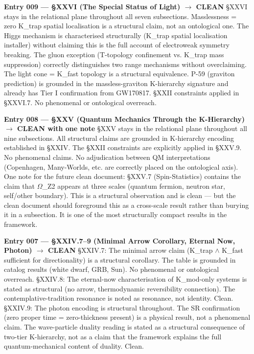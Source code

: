 \documentclass[12pt,a4paper]{article}
\begin{document}
\textbf{Entry 009 --- §XXVI (The Special Status of Light) $\rightarrow$ CLEAN}
§XXVI stays in the relational plane throughout all seven subsections. Masslessness = zero K\_trap spatial localisation is a structural claim, not an ontological one. The Higgs mechanism is characterised structurally (K\_trap spatial localisation installer) without claiming this is the full account of electroweak symmetry breaking. The gluon exception (T-topology confinement vs. K\_trap mass suppression) correctly distinguishes two range mechanisms without overclaiming. The light cone = K\_fast topology is a structural equivalence. P-59 (graviton prediction) is grounded in the massless-graviton K-hierarchy signature and already has Tier I confirmation from GW170817. §XXII constraints applied in §XXVI.7. No phenomenal or ontological overreach.

\textbf{Entry 008 --- §XXV (Quantum Mechanics Through the K-Hierarchy) $\rightarrow$ CLEAN with one note}
§XXV stays in the relational plane throughout all nine subsections. All structural claims are grounded in K-hierarchy encoding established in §XXIV. The §XXII constraints are explicitly applied in §XXV.9. No phenomenal claims. No adjudication between QM interpretations (Copenhagen, Many-Worlds, etc. are correctly placed on the ontological axis). One note for the future clean document: §XXV.7 (Spin-Statistics) contains the claim that $\Omega$\_Z2 appears at three scales (quantum fermion, neutron star, self/other boundary). This is a structural observation and is clean --- but the clean document should foreground this as a cross-scale result rather than burying it in a subsection. It is one of the most structurally compact results in the framework.

\textbf{Entry 007 --- §XXIV.7--9 (Minimal Arrow Corollary, Eternal Now, Photon) $\rightarrow$ CLEAN}
§XXIV.7: The minimal arrow claim (K\_trap $\land$ K\_fast sufficient for directionality) is a structural corollary. The table is grounded in catalog results (white dwarf, GRB, Sun). No phenomenal or ontological overreach.
§XXIV.8: The eternal-now characterisation of K\_mod-only systems is stated as structural (no arrow, thermodynamic reversibility connection). The contemplative-tradition resonance is noted as resonance, not identity. Clean.
§XXIV.9: The photon encoding is structural throughout. The SR confirmation (zero proper time = zero-thickness present) is a physical result, not a phenomenal claim. The wave-particle duality reading is stated as a structural consequence of two-tier K-hierarchy, not as a claim that the framework explains the full quantum-mechanical content of duality. Clean.
\end{document}
